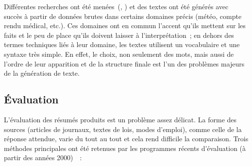 \documentclass[a4paper, 12pt]{article}
\begin{document}
Différentes recherches ont été menées~(\cite{danlos_generation_2000}, \cite{horacek_building_2001}) et des textes ont été générés avec succès à partir de données brutes dans certains domaines précis (météo, compte rendu médical, etc.). Ces domaines ont en commun l'accent qu'ils mettent sur les faits et le peu de place qu'ils doivent laisser à l'interprétation~; en dehors des termes techniques liés à leur domaine, les textes utilisent un vocabulaire et une syntaxe très simple. En effet, le choix, non seulement des mots, mais aussi de l'ordre de leur apparition et de la structure finale est l'un des problèmes majeurs de la génération de texte.

\subsection{Évaluation}

L'évaluation des résumés produits est un problème assez délicat. La forme des sources (articles de journaux, textes de lois, modes d'emploi), comme celle de la réponse attendue, varie du tout au tout et cela rend difficile la comparaison. Trois méthodes principales ont été retenues par les programmes récents d'évaluation (à partir des années 2000)~\cite[p.1453-1461]{jones_automatic_2007}~:
\end{document}
